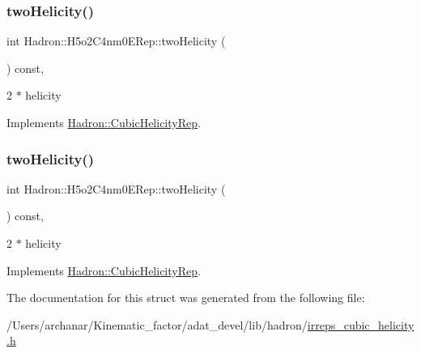 \subsubsection{\texorpdfstring{twoHelicity()}{twoHelicity()}\hspace{0.1cm}{\footnotesize\ttfamily [1/2]}}
{\footnotesize\ttfamily int Hadron\+::\+H5o2\+C4nm0\+E\+Rep\+::two\+Helicity (\begin{DoxyParamCaption}{ }\end{DoxyParamCaption}) const\hspace{0.3cm}{\ttfamily [inline]}, {\ttfamily [virtual]}}

2 $\ast$ helicity 

Implements \mbox{\hyperlink{structHadron_1_1CubicHelicityRep_af507aa56fc2747eacc8cb6c96db31ecc}{Hadron\+::\+Cubic\+Helicity\+Rep}}.

\mbox{\label{structHadron_1_1H5o2C4nm0ERep_a3f459ff8e7a5af2e24b6bc9b86d70a87}} 
\subsubsection{\texorpdfstring{twoHelicity()}{twoHelicity()}\hspace{0.1cm}{\footnotesize\ttfamily [2/2]}}
{\footnotesize\ttfamily int Hadron\+::\+H5o2\+C4nm0\+E\+Rep\+::two\+Helicity (\begin{DoxyParamCaption}{ }\end{DoxyParamCaption}) const\hspace{0.3cm}{\ttfamily [inline]}, {\ttfamily [virtual]}}

2 $\ast$ helicity 

Implements \mbox{\hyperlink{structHadron_1_1CubicHelicityRep_af507aa56fc2747eacc8cb6c96db31ecc}{Hadron\+::\+Cubic\+Helicity\+Rep}}.



The documentation for this struct was generated from the following file\+:\begin{DoxyCompactItemize}
\item 
/\+Users/archanar/\+Kinematic\+\_\+factor/adat\+\_\+devel/lib/hadron/\mbox{\hyperlink{lib_2hadron_2irreps__cubic__helicity_8h}{irreps\+\_\+cubic\+\_\+helicity.\+h}}\end{DoxyCompactItemize}
